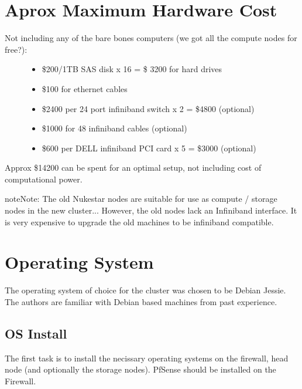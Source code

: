 \documentclass[letterpaper,10pt,english]{sphinxmanual}
\begin{document}
\section{Aprox Maximum Hardware Cost}
\label{setup:aprox-maximum-hardware-cost}\begin{description}
\item[{Not including any of the bare bones computers (we got all the compute nodes for free?):}] \leavevmode\begin{itemize}
\item {} 
\$200/1TB SAS disk  x 16 = \$ 3200  for hard drives

\item {} 
\$100 for ethernet cables

\item {} 
\$2400 per 24 port infiniband switch x 2 = \$4800  (optional)

\item {} 
\$1000 for 48 infiniband cables (optional)

\item {} 
\$600 per DELL infiniband PCI card x 5 = \$3000 (optional)

\end{itemize}

\end{description}

Approx \$14200 can be spent for an optimal setup, not including cost of computational power.

\begin{notice}{note}{Note:}
The old Nukestar nodes are suitable for use as compute / storage nodes in the new cluster...
However, the old nodes lack an Infiniband interface.  It is very expensive to upgrade the old
machines to be infiniband compatible.
\end{notice}


\section{Operating System}
\label{setup:operating-system}
The operating system of choice for the cluster was chosen to be
Debian Jessie.  The authors are familiar with Debian based machines from
past experience.


\subsection{OS Install}
\label{setup:os-install}
The first task is to install the necissary operating systems on the firewall,
head node (and optionally the storage nodes).  PfSense should be installed on the Firewall.
\end{document}
